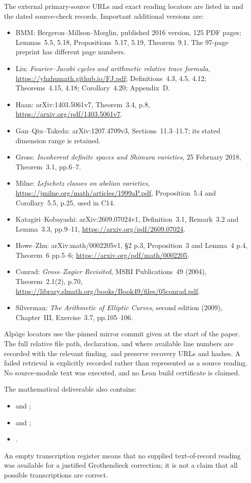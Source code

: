 The external primary-source URLs and exact reading locators are
listed in  and the
dated source-check records. Important additional versions are:
\begin{itemize}[leftmargin=*]
\item BMM: Bergeron--Millson--M\oe glin, published 2016 version,
125 PDF pages; Lemmas~5.5, 5.18, Propositions~5.17, 5.19,
Theorem~9.1. The 97-page preprint has different page numbers.
\item Liu: \emph{Fourier--Jacobi cycles and arithmetic relative
trace formula}, \url{https://yhzhumath.github.io/FJ.pdf};
Definitions~4.3, 4.5, 4.12; Theorems~4.15, 4.18;
Corollary~4.20; Appendix~D.
\item Haan: arXiv:1403.5061v7, Theorem~3.4, p.8,
\url{https://arxiv.org/pdf/1403.5061v7}.
\item Gan--Qiu--Takeda: arXiv:1207.4709v3,
Sections~11.3--11.7; its stated dimension range is retained.
\item Gross: \emph{Incoherent definite spaces and Shimura varieties},
25 February 2018, Theorem~3.1, pp.6--7.
\item Milne: \emph{Lefschetz classes on abelian varieties},
\url{https://jmilne.org/math/articles/1999aP.pdf},
Proposition~5.4 and Corollary~5.5, p.25, used in C14.
\item Katagiri--Kobayashi: arXiv:2609.07024v1,
Definition~3.1, Remark~3.2 and Lemma~3.3, pp.9--11,
\url{https://arxiv.org/pdf/2609.07024}.
\item Howe--Zhu: arXiv:math/0002205v1,
\S2 p.3, Proposition~3 and Lemma~4 p.4,
Theorem~6 pp.5--6; \url{https://arxiv.org/pdf/math/0002205}.
\item Conrad: \emph{Gross--Zagier Revisited}, MSRI
Publications~49 (2004), Theorem~2.1(2), p.70,
\url{https://library.slmath.org/books/Book49/files/05conrad.pdf}.
\item Silverman: \emph{The Arithmetic of Elliptic Curves},
second edition (2009), Chapter~III, Exercise~3.7,
pp.105--106.
\end{itemize}

Alp\"oge locators use the pinned mirror commit given at the start
of the paper. The full relative file path, declaration, and where
available line numbers are recorded with the relevant finding.
 and
 preserve recovery
URLs and hashes. A failed retrieval is explicitly recorded rather
than represented as a source reading. No source-module text was
executed, and no Lean build certificate is claimed.

The mathematical deliverable also contains:
\begin{itemize}[leftmargin=*]
\item {} and ;
\item {} and ;
\item {}.
\end{itemize}
An empty transcription register means that no
supplied text-of-record reading was available for a justified
Grothendieck correction; it is not a claim that all possible
transcriptions are correct.
